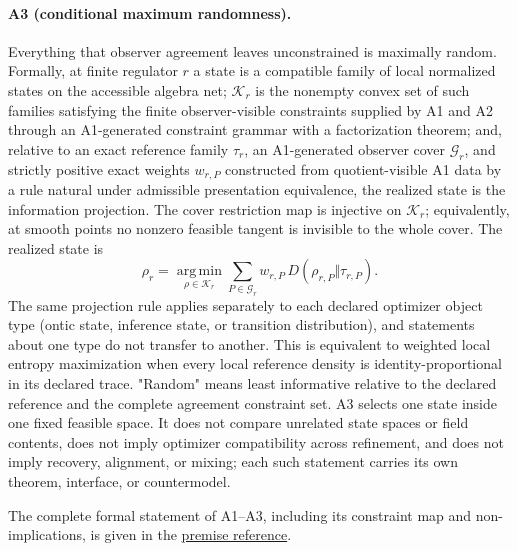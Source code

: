 \paragraph{A3 (conditional maximum randomness).}
Everything that observer agreement leaves unconstrained is maximally random.
Formally, at finite regulator \(r\) a state is a compatible family of local
normalized states on the accessible algebra net; \(\mathcal K_r\) is the
nonempty convex set of such families satisfying the finite observer-visible
constraints supplied by A1 and A2 through an A1-generated constraint
grammar with a factorization theorem; and, relative to an exact reference
family \(\tau_r\), an A1-generated observer cover \(\mathcal G_r\), and
strictly positive exact weights \(w_{r,P}\) constructed from quotient-visible
A1 data by a rule natural under admissible presentation equivalence, the
realized state is the
information projection. The cover restriction map is injective on
\(\mathcal K_r\); equivalently, at smooth points no nonzero feasible
tangent is invisible to the whole cover. The realized state is
\[
\rho_r=\operatorname*{arg\,min}_{\rho\in\mathcal K_r}
\sum_{P\in\mathcal G_r} w_{r,P}\,D(\rho_{r,P}\Vert\tau_{r,P}).
\]
The same projection rule applies separately to each declared optimizer
object type (ontic state, inference state, or transition distribution), and
statements about one type do not transfer to another.
This is equivalent to weighted local entropy maximization when every local
reference density is identity-proportional in its declared trace. "Random"
means least informative relative to the
declared reference and the complete agreement constraint set. A3
selects one state inside one fixed feasible space. It does not compare
unrelated state spaces or field contents, does not imply optimizer
compatibility across refinement, and does not imply recovery, alignment, or
mixing; each such statement carries its own theorem, interface, or
countermodel.

The complete formal statement of A1--A3, including its constraint map and
non-implications, is given in the
\href{https://github.com/FloatingPragma/observer-patch-holography/blob/r2055/docs/AXIOM_REFERENCE.md}
{premise reference}.
